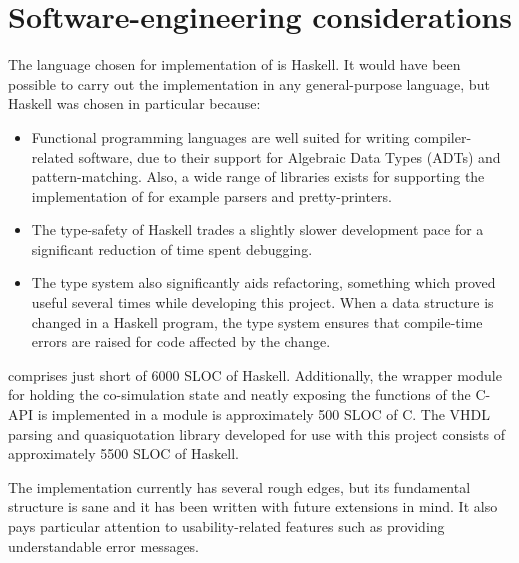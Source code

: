 \section{Software-engineering considerations}
The language chosen for implementation of \libsme{} is Haskell. It would have
been possible to carry out the implementation in any general-purpose language,
but Haskell was chosen in particular because:
\begin{itemize}
\item Functional programming languages are well suited for writing
  compiler-related software, due to their support for Algebraic Data Types
  (ADTs) and pattern-matching. Also, a wide range of libraries exists for
  supporting the implementation of for example parsers and pretty-printers.
\item The type-safety of Haskell trades a slightly slower development pace for a
  significant reduction of time spent debugging.
\item The type system also significantly aids refactoring, something which
  proved useful several times while developing this project. When a data
  structure is changed in a Haskell program, the type system ensures that
  compile-time errors are raised for code affected by the change.
\end{itemize}

\libsme{} comprises just short of 6000 SLOC of Haskell. Additionally, the
wrapper module for holding the co-simulation state and neatly exposing the
functions of the C-API is implemented in a module is approximately 500 SLOC of
C. The VHDL parsing and quasiquotation library developed for use with this
project consists of approximately 5500 SLOC of Haskell.

The implementation currently has several rough edges, but its fundamental
structure is sane and it has been written with future extensions in mind. It
also pays particular attention to usability-related features such as providing
understandable error messages.

